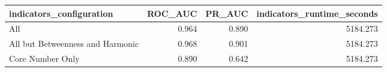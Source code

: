 \begin{tabular}{lrrr}
\toprule
indicators_configuration & ROC_AUC & PR_AUC & indicators_runtime_seconds \\
\midrule
All & 0.964 & 0.890 & 5184.273 \\
All but Betweenness and Harmonic & 0.968 & 0.901 & 5184.273 \\
Core Number Only & 0.890 & 0.642 & 5184.273 \\
\bottomrule
\end{tabular}
